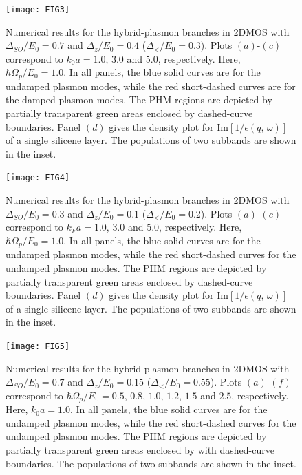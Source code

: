 \documentclass[aps,prb,showpacs]{revtex4}
\begin{document}
\begin{figure}
\centering
\texttt{[image: FIG3]}
\caption{Numerical results for the hybrid-plasmon branches in 2DMOS with $\Delta_{SO}/E_0=0.7$ and $\Delta_{z}/E_0=0.4$ ($\Delta_</E_0=0.3$).
Plots $(a)$-$(c)$ correspond to $k_0a=1.0$, $3.0$ and $5.0$, respectively. Here, $\hbar\Omega_p/E_0=1.0$.
In all panels, the blue solid curves are for the undamped plasmon modes, while the red short-dashed curves are for the damped plasmon modes. 
The PHM regions are depicted by partially transparent green areas enclosed by dashed-curve boundaries.  
Panel $(d)$ gives the density plot for $\text{Im}\left[1/\epsilon(q,\,\omega)\right]$ of a single silicene layer. 
The populations of two subbands are shown in the inset.}
\label{FIG:3}
\end{figure}

\begin{figure}
\centering
\texttt{[image: FIG4]}
\caption{Numerical results for the hybrid-plasmon branches in 2DMOS with $\Delta_{SO}/E_0=0.3$ and $\Delta_{z}/E_0=0.1$ ($\Delta_</E_0=0.2$).
Plots $(a)$-$(c)$ correspond to $k_Fa=1.0$, $3.0$ and $5.0$, respectively. Here, $\hbar\Omega_p/E_0=1.0$.
In all panels, the blue solid curves are for the undamped plasmon modes, while the red short-dashed curves for the undamped plasmon modes. 
The PHM regions are depicted by partially transparent green areas enclosed by dashed-curve boundaries.  
Panel $(d)$ gives the density plot for $\text{Im}\left[1/\epsilon(q,\,\omega)\right]$ of a single silicene layer. 
The populations of two subbands are shown in the inset.}
\label{FIG:4}
\end{figure}

\begin{figure}
\centering
\texttt{[image: FIG5]}
\caption{Numerical results for the hybrid-plasmon branches in 2DMOS with $\Delta_{SO}/E_0=0.7$ and $\Delta_{z}/E_0=0.15$ ($\Delta_</E_0=0.55$).
Plots $(a)$-$(f)$ correspond to $\hbar\Omega_p/E_0=0.5$, $0.8$, $1.0$, $1.2$, $1.5$ and $2.5$, respectively. Here, $k_0a=1.0$.
In all panels, the blue solid curves are for the undamped plasmon modes, while the red short-dashed curves for the undamped plasmon modes. 
The PHM regions are depicted by partially transparent green areas enclosed by with dashed-curve boundaries.  
The populations of two subbands are shown in the inset.}
\label{FIG:5}
\end{figure}
\end{document}
